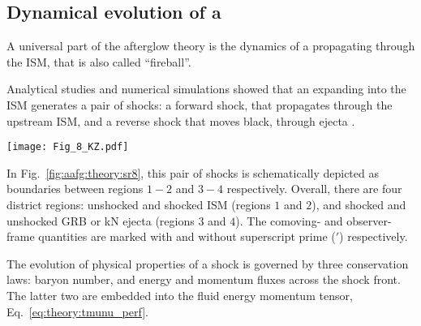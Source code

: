 \subsection{Dynamical evolution of a \blast{}}

A universal part of the afterglow theory is the dynamics of a  
\blast{} propagating through the \ac{ISM}, that is also called ``fireball''.

Analytical studies and numerical simulations showed that an 
expanding into the \ac{ISM} \blast{} generates a pair of shocks: a forward shock, that 
propagates through the upstream \ac{ISM}, and a reverse shock that moves black, 
through ejecta \citep[\eg][]{Blandford:1976,Ayache:2021six}. 
\begin{figure*}[t]
    \centering 
    \texttt{[image: Fig\_8\_KZ.pdf]}
    \caption{
        Schematic sketch of a pair of shocks produced when a relativistic
        jet from a \ac{GRB} collides with the \ac{CBM}, as viewed from the
        rest frame of unshocked \ac{CBM}. Regions 2 \& 3 represent shocked \ac{CBM} and \ac{GRB}
        jet respectively. They move together with the same \ac{LF} ($\gamma_2$, as viewed
        by a stationary observer in the unshocked \ac{CBM}), and have the same pressure but
        different densities.
        (Adapted from \citet{Kumar:2014upa}, Fig.~8)
    }
    \label{fig:aafg:theory:sr8}
\end{figure*}
In Fig.~\ref{fig:aafg:theory:sr8}, this pair of shocks is schematically depicted as 
boundaries between regions $1-2$ and $3-4$ respectively. 
Overall, there are four district regions: unshocked and shocked \ac{ISM} 
(regions $1$ and $2$), and shocked and unshocked \ac{GRB} or \ac{kN} ejecta 
(regions $3$ and $4$).
The comoving- and observer-frame quantities are marked with and 
without superscript prime ($'$) respectively. 

The evolution of physical properties of a shock is governed by three conservation laws: 
baryon number, and energy and momentum fluxes across the shock front. 
The latter two are embedded into the fluid energy momentum tensor, Eq.~\eqref{eq:theory:tmunu_perf}. 

